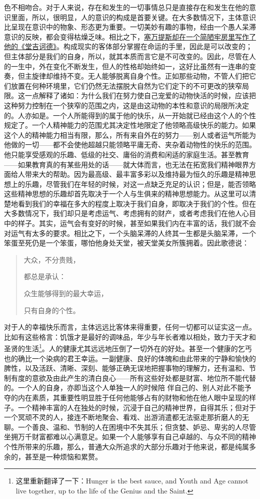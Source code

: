 \documentclass[12pt,oneside]{book}
\begin{document}
色不相吻合。对于人来说，存在和发生的一切事情总只是直接存在和发生在他的意识里面，所以，很明显，人的意识的构成是首要关键。在大多数情况下，主体意识比呈现在意识中的物象、形态更为重要。一切美妙有趣的事物，经由一个愚人呆滞意识的反映，都会变得枯燥乏味。相比之下，\uline{塞万提斯却在一个简陋牢房里写作了他的《堂吉诃德》}。构成现实的客体部分掌握在命运的手里，因此是可以改变的；但主体部分是我们的自身，所以，就其本质而言它是不可改变的。因此，尽管在人的一生中，外在变化不断发生，但人的性格却始终如一，这好比虽然有一连串的变奏，但主旋律却维持不变。无人能够脱离自身个性。正如那些动物，不管人们把它们放置在何种环境里，它们仍然无法摆脱大自然为它们定下的不可更改的狭窄局限。这一点解释了诸如：为什么我们在努力使自己宠爱的动物快活的时候，应该把这种努力控制在一个狭窄的范围之内，这是由这动物的本性和意识的局限所决定的。人亦如是。一个人所能得到的属于他的快乐，从一开始就已经由这个人的个性规定了。一个人精神能力的范围尤其决定性地限定了他领略高级快乐的能力。如果这个人的精神能力相当有限，那么，所有来自外在的努力——别人或者运气所能为他做的一切——都不会使他超越只能领略平庸无奇、夹杂着动物性的快乐的范围。他只能享受感观的乐趣、低级的社交、庸俗的消费和闲适的家庭生活。甚至教育——如果教育真的有某些用处的话——就大体而言，也无法在拓宽我们精神眼界方面给人带来大的帮助。因为最高级、最丰富多彩以及维持最为恒久的乐趣是精神思想上的乐趣，尽管我们在年轻的时候，对这一点缺乏充足的认识；但是，能否领略这些精神思想的乐趣却首先取决于一个人与生俱来的精神思想能力。从这里可以清楚地看到我们的幸福在多大的程度上取决于我们自身，即取决于我们的个性。但在大多数情况下，我们却只是考虑运气、考虑拥有的财产，或者考虑我们在他人心目中的样子。其实，运气会有变好的时候，甚至如果我们内在丰富的话，我们就不会对运气有太多的要求。相比之下，一个头脑呆滞的人终其一生都是头脑呆滞，一个笨蛋至死仍是一个笨蛋，哪怕他身处天堂，被天堂美女所簇拥着。因此歌德说： 


\begin{quotation}
大众，不分贵贱， 

都总是承认： 

众生能够得到的最大幸运， 

只有自身的个性。 
\end{quotation}


 
对于人的幸福快乐而言，主体远远比客体来得重要，任何一切都可以证实这一点。比如有这些格言：饥饿才是最好的调味品，年少与年长者难以相处，致力于天才和圣贤的生活\footnote{ 这里重新翻译了一下：Hunger is the best sauce, and Youth and Age cannot live together, up to the life of the Genius and the Saint.}。人的健康尤其远远地压倒了一切外在的好处。甚至一个健康的乞丐也的确比一个染病的君王幸运。一副健康、良好的体魄和由此带来的宁静和愉快的脾性，以及活跃、清晰、深刻、能够正确无误地把握事物的理解力，还有温和、节制有度的意欲及由此产生的清白良心——所有这些好处都是财富、地位所不能代替的。一个人的自身，亦即当这个人单独一人的时候陪
伴自己的、别人对此不能予夺的内在素质，其重要性明显胜于任何他能够占有的财物和他在他人眼中呈现的样子。一个精神丰富的人在独处的时候，沉浸于自己的精神世界，自得其乐；但对于一个冥顽不灵的人，接连不断地聚会、看戏、出游消遣都无法驱走那折磨人的无聊。一个善良、温和、节制的人在困境中不失其乐；但贪婪、妒忌、卑劣的人尽管坐拥万千财富都难以心满意足。如果一个人能够享有自己卓越的、与众不同的精神个性所带来的乐趣，那么，普通大众所追求的大部分乐趣对于他来说，都是纯属多余的，甚至是一种烦恼和累赘。 
\end{document}
